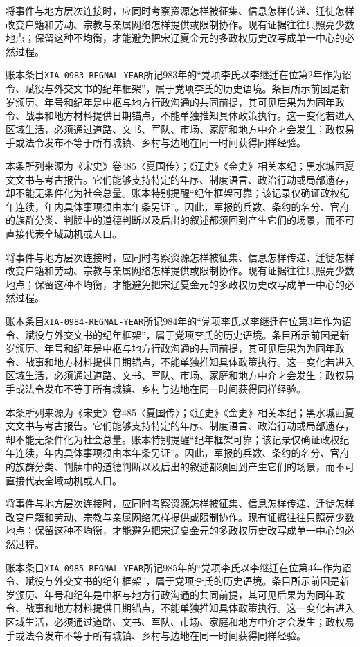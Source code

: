将事件与地方层次连接时，应同时考察资源怎样被征集、信息怎样传递、迁徙怎样改变户籍和劳动、宗教与亲属网络怎样提供或限制协作。现有证据往往只照亮少数地点；保留这种不均衡，才能避免把宋辽夏金元的多政权历史改写成单一中心的必然过程。

账本条目\texttt{XIA-0983-REGNAL-YEAR}所记983年的“党项李氏以李继迁在位第2年作为诏令、赋役与外交文书的纪年框架”，属于党项李氏的历史语境。条目所示前因是新岁颁历、年号和纪年是中枢与地方行政沟通的共同前提，其可见后果为为同年政令、战事和地方材料提供日期锚点，不能单独推知具体政策执行。这一变化若进入区域生活，必须通过道路、文书、军队、市场、家庭和地方中介才会发生；政权易手或法令发布不等于所有城镇、乡村与边地在同一时间获得同样经验。

本条所列来源为《宋史》卷485〈夏国传〉；《辽史》《金史》相关本纪；黑水城西夏文文书与考古报告。它们能够支持特定的年序、制度语言、政治行动或局部遗存，却不能无条件化为社会总量。账本特别提醒“纪年框架可靠；该记录仅确证政权纪年连续，年内具体事项须由本年条另证”。因此，军报的兵数、条约的名分、官府的族群分类、判牍中的道德判断以及后出的叙述都须回到产生它们的场景，而不可直接代表全域动机或人口。

将事件与地方层次连接时，应同时考察资源怎样被征集、信息怎样传递、迁徙怎样改变户籍和劳动、宗教与亲属网络怎样提供或限制协作。现有证据往往只照亮少数地点；保留这种不均衡，才能避免把宋辽夏金元的多政权历史改写成单一中心的必然过程。

账本条目\texttt{XIA-0984-REGNAL-YEAR}所记984年的“党项李氏以李继迁在位第3年作为诏令、赋役与外交文书的纪年框架”，属于党项李氏的历史语境。条目所示前因是新岁颁历、年号和纪年是中枢与地方行政沟通的共同前提，其可见后果为为同年政令、战事和地方材料提供日期锚点，不能单独推知具体政策执行。这一变化若进入区域生活，必须通过道路、文书、军队、市场、家庭和地方中介才会发生；政权易手或法令发布不等于所有城镇、乡村与边地在同一时间获得同样经验。

本条所列来源为《宋史》卷485〈夏国传〉；《辽史》《金史》相关本纪；黑水城西夏文文书与考古报告。它们能够支持特定的年序、制度语言、政治行动或局部遗存，却不能无条件化为社会总量。账本特别提醒“纪年框架可靠；该记录仅确证政权纪年连续，年内具体事项须由本年条另证”。因此，军报的兵数、条约的名分、官府的族群分类、判牍中的道德判断以及后出的叙述都须回到产生它们的场景，而不可直接代表全域动机或人口。

将事件与地方层次连接时，应同时考察资源怎样被征集、信息怎样传递、迁徙怎样改变户籍和劳动、宗教与亲属网络怎样提供或限制协作。现有证据往往只照亮少数地点；保留这种不均衡，才能避免把宋辽夏金元的多政权历史改写成单一中心的必然过程。

账本条目\texttt{XIA-0985-REGNAL-YEAR}所记985年的“党项李氏以李继迁在位第4年作为诏令、赋役与外交文书的纪年框架”，属于党项李氏的历史语境。条目所示前因是新岁颁历、年号和纪年是中枢与地方行政沟通的共同前提，其可见后果为为同年政令、战事和地方材料提供日期锚点，不能单独推知具体政策执行。这一变化若进入区域生活，必须通过道路、文书、军队、市场、家庭和地方中介才会发生；政权易手或法令发布不等于所有城镇、乡村与边地在同一时间获得同样经验。

